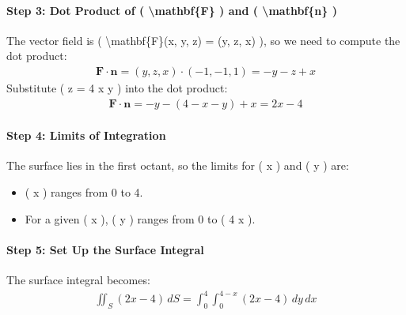 \documentclass[letterpaper,10pt,english]{jupyterBook}
\begin{document}
\paragraph{Step 3: Dot Product of ( \textbackslash{}mathbf\{F\} ) and ( \textbackslash{}mathbf\{n\} )}
\label{\detokenize{prerequisites:step-3-dot-product-of-mathbf-f-and-mathbf-n}}
\sphinxAtStartPar
The vector field is ( \textbackslash{}mathbf\{F\}(x, y, z) = (y, z, x) ), so we need to compute the dot product:
\begin{equation*}
\begin{split}
\mathbf{F} \cdot \mathbf{n} = (y, z, x) \cdot (-1, -1, 1) = -y - z + x
\end{split}
\end{equation*}
\sphinxAtStartPar
Substitute ( z = 4 \sphinxhyphen{} x \sphinxhyphen{} y ) into the dot product:
\begin{equation*}
\begin{split}
\mathbf{F} \cdot \mathbf{n} = -y - (4 - x - y) + x = 2x - 4
\end{split}
\end{equation*}

\paragraph{Step 4: Limits of Integration}
\label{\detokenize{prerequisites:step-4-limits-of-integration}}
\sphinxAtStartPar
The surface lies in the first octant, so the limits for ( x ) and ( y ) are:
\begin{itemize}
\item {} 
\sphinxAtStartPar
( x ) ranges from 0 to 4.

\item {} 
\sphinxAtStartPar
For a given ( x ), ( y ) ranges from 0 to ( 4 \sphinxhyphen{} x ).

\end{itemize}


\paragraph{Step 5: Set Up the Surface Integral}
\label{\detokenize{prerequisites:step-5-set-up-the-surface-integral}}
\sphinxAtStartPar
The surface integral becomes:
\begin{equation*}
\begin{split}
\iint_S (2x - 4) \, dS = \int_0^4 \int_0^{4-x} (2x - 4) \, dy \, dx
\end{split}
\end{equation*}
\end{document}
